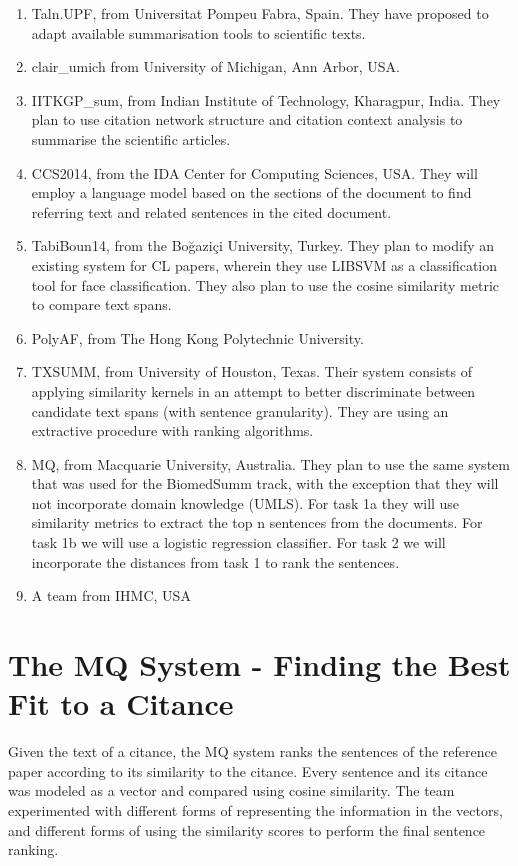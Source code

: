 \documentclass[11pt]{article}
\begin{document}
\begin{enumerate}
\item{Taln.UPF, from Universitat Pompeu Fabra, Spain. They have proposed to adapt available summarisation tools to scientific texts.}
\item{clair\_umich from University of Michigan, Ann Arbor, USA.}
\item{IITKGP\_sum, from Indian Institute of Technology, Kharagpur, India. They plan to use citation network structure and citation context analysis to summarise the scientific articles.}
\item{CCS2014, from the IDA Center for Computing Sciences, USA. They will employ a language model based on the sections of the document to find referring text and related sentences in the cited document.}
\item{TabiBoun14, from the Boğaziçi University, Turkey. They plan to modify an existing system for CL papers, wherein they use LIBSVM as a classification tool for face classification. They also plan to use the cosine similarity metric to compare text spans.}
\item{PolyAF, from The Hong Kong Polytechnic University.}
\item{TXSUMM, from University of Houston, Texas. Their system consists of applying similarity kernels in an attempt to better discriminate between candidate text spans (with sentence granularity). They are using an extractive procedure with ranking algorithms.}
\item{MQ, from Macquarie University, Australia. They plan to use the same system that was used for the BiomedSumm track, with the exception that they will not incorporate domain knowledge (UMLS). For task 1a they will use similarity metrics to extract the top n sentences from the documents. For task 1b we will use a logistic regression classifier. For task 2 we will incorporate the distances from task 1 to rank the sentences.}
\item{A team from IHMC, USA}

\end{enumerate}

\section{The MQ System - Finding the Best Fit to a Citance}

Given the text of a citance, the MQ system ranks the sentences of the reference paper according to its similarity to the citance. Every sentence and its citance was modeled as a vector and compared using cosine similarity. The team experimented with different forms of representing the information in the vectors, and different forms of using the similarity scores to perform the final sentence ranking.
\end{document}
